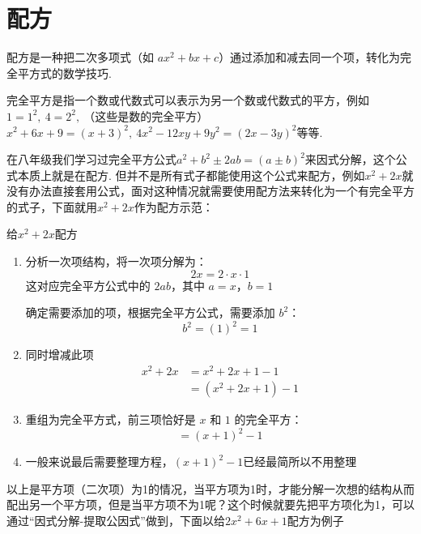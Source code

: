 \documentclass[lang=cn, 10pt, titlestyle=hang, oneside]{elegantbook}
\begin{document}
\section{配方}



配方是一种把二次多项式（如 \(ax^2 + bx + c\)）通过添加和减去同一个项，转化为完全平方式的数学技巧.
\par
\begin{remark}
    完全平方是指一个数或代数式可以表示为另一个数或代数式的平方，例如\( 1=1^2,\ 4=2^2,\ \)（这些是数的完全平方）\(x^2+6x+9=(x+3)^2,\ 4x^2-12xy+9y^2=(2x-3y)^2\)等等.
\end{remark}
\par
在八年级我们学习过完全平方公式\(a^2+b^2\pm2ab=(a\pm b)^2\)来因式分解，这个公式本质上就是在配方. 但并不是所有式子都能使用这个公式来配方，例如\(x^2+2x\)就没有办法直接套用公式，面对这种情况就需要使用配方法来转化为一个有完全平方的式子，下面就用\(x^2+2x\)作为配方示范：
\begin{example}
给\(x^2+2x\)配方
\end{example}
\par
\begin{solution}
    \begin{enumerate}
  \item 分析一次项结构，将一次项分解为：\\
  \[
  2x = 2 \cdot x \cdot 1
  \]
  这对应完全平方公式中的 \(2ab\)，其中 \(a = x\)，\(b = 1\)
  
  确定需要添加的项，根据完全平方公式，需要添加 \(b^2\)：
  \[
  b^2 = (1)^2 = 1
  \]
  
  \item 同时增减此项
  \begin{align*}
  x^2 + 2x &= x^2 + 2x + 1 - 1 \\
            &= (x^2 + 2x + 1) - 1
  \end{align*}
  
  \item 重组为完全平方式，前三项恰好是 \(x\) 和 \(1\) 的完全平方：
  \[
  = (x + 1)^2-1
  \]
  \item 一般来说最后需要整理方程，$(x + 1)^2-1$已经最简所以不用整理
\end{enumerate}

\end{solution}
以上是平方项（二次项）为1的情况，当平方项为1时，才能分解一次想的结构从而配出另一个平方项，但是当平方项不为1呢？这个时候就要先把平方项化为1，可以通过“因式分解-提取公因式”做到，下面以给\(2x^2 + 6x+1\)配方为例子
\par
\end{document}
